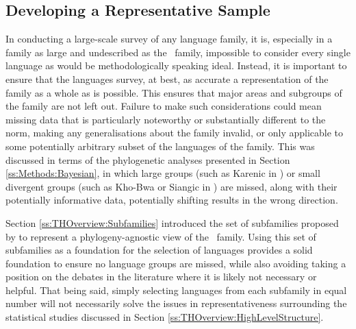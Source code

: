 \subsection{Developing a Representative Sample}\label{ss:Methods:RepSample}
In conducting a large-scale survey of any language family, it is, especially in a family as large and undescribed as the \lfam\ family, impossible to consider every single language as would be methodologically speaking ideal. Instead, it is important to ensure that the languages survey, at best, as accurate a representation of the family as a whole as is possible. This ensures that major areas and subgroups of the family are not left out. Failure to make such considerations could mean missing data that is particularly noteworthy or substantially different to the norm, making any generalisations about the family invalid, or only applicable to some potentially arbitrary subset of the languages of the family. This was discussed in terms of the phylogenetic analyses presented in Section \ref{ss:Methods:Bayesian}, in which large groups (such as Karenic in ) or small divergent groups (such as Kho-Bwa or Siangic in ) are missed, along with their potentially informative data, potentially shifting results in the wrong direction.

Section \ref{ss:THOverview:Subfamilies} introduced the set of subfamilies proposed by  to represent a phylogeny-agnostic view of the \lfam\ family. Using this set of subfamilies as a foundation for the selection of languages provides a solid foundation to ensure no language groups are missed, while also avoiding taking a position on the debates in the literature where it is likely not necessary or helpful. That being said, simply selecting languages from each subfamily in equal number will not necessarily solve the issues in representativeness surrounding the statistical studies discussed in Section \ref{ss:THOverview:HighLevelStructure}.


